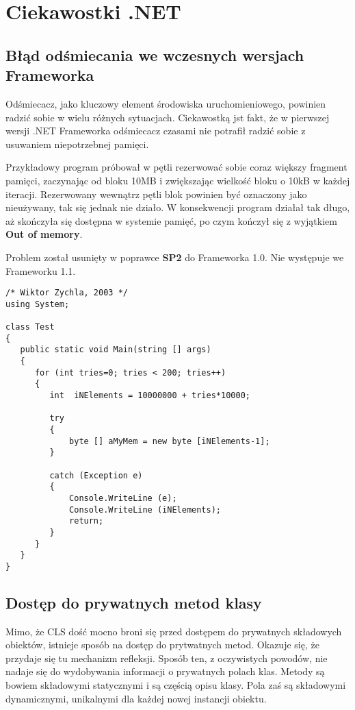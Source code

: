 ﻿\section{Ciekawostki .NET}

\subsection{Błąd odśmiecania we wczesnych wersjach Frameworka}

Odśmiecacz, jako kluczowy element środowiska uruchomieniowego, powinien radzić sobie w wielu
różnych sytuacjach. Ciekawostką jst fakt, że w pierwszej wersji .NET Frameworka odśmiecacz czasami nie 
potrafił radzić sobie z usuwaniem niepotrzebnej pamięci.

Przykładowy program próbował w pętli rezerwować sobie coraz większy fragment pamięci, 
zaczynając od bloku 10MB i zwiększając wielkość bloku o 10kB w każdej iteracji. Rezerwowany wewnątrz
pętli blok powinien być oznaczony jako nieużywany, tak się jednak nie działo. W konsekwencji program działał
tak długo, aż skończyła się dostępna w systemie pamięć, po czym kończył się z wyjątkiem {\bf Out of memory}.

Problem został usunięty w poprawce {\bf SP2} do Frameworka 1.0. Nie występuje we Frameworku 1.1.

\begin{scriptsize}
\begin{verbatim}
/* Wiktor Zychla, 2003 */
using System;

class Test
{
   public static void Main(string [] args)
   {
      for (int tries=0; tries < 200; tries++)
      {
         int  iNElements = 10000000 + tries*10000;
         
         try
         {
             byte [] aMyMem = new byte [iNElements-1];
         }
         
         catch (Exception e)
         {
             Console.WriteLine (e);
             Console.WriteLine (iNElements);
             return;
         }         
      }
   }
}
\end{verbatim}
\end{scriptsize}

\subsection{Dostęp do prywatnych metod klasy}

Mimo, że CLS dość mocno broni się przed dostępem do prywatnych składowych obiektów, 
istnieje sposób na dostęp do prytwatnych metod. Okazuje się, że przydaje się tu mechanizm
refleksji. Sposób ten, z oczywistych powodów, nie nadaje się do wydobywania informacji o
prywatnych polach klas. Metody są bowiem składowymi statycznymi i są częścią opisu klasy. 
Pola zaś są składowymi dynamicznymi, unikalnymi dla każdej nowej instancji obiektu.

